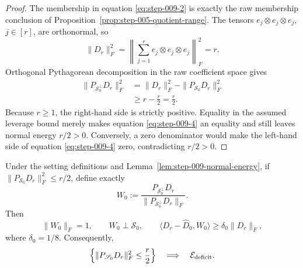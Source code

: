 \begin{proof}
The membership in equation \eqref{eq:step-009-2} is exactly the raw
membership conclusion of
Proposition~\ref{prop:step-005-quotient-range}. The tensors
\(e_j\otimes e_j\otimes e_j\), \(j\in[r]\), are orthonormal, so
\begin{equation}
  \|D_r\|_F^2
  =\left\|\sum_{j=1}^r e_j\otimes e_j\otimes e_j\right\|_F^2
  =r.
  \label{eq:step-009-3}
\end{equation}
Orthogonal Pythagorean decomposition in the raw coefficient space gives
\begin{equation}
\begin{aligned}
  \|P_{\mathscr S_0^\perp}D_r\|_F^2
  &=\|D_r\|_F^2-\|P_{\mathscr S_0}D_r\|_F^2\\
  &\ge r-\frac r2
   =\frac r2.
\end{aligned}\label{eq:step-009-4}
\end{equation}
Because \(r\ge1\), the right-hand side is strictly positive. Equality in
the assumed leverage bound merely makes equation \eqref{eq:step-009-4} an equality and still leaves normal energy
\(r/2>0\). Conversely, a zero denominator would make the left-hand side of
equation \eqref{eq:step-009-4} zero, contradicting \(r/2>0\). 

\end{proof}


\begin{proposition}
\label{prop:step-009-raw-witness}
Under the setting definitions and
Lemma~\ref{lem:step-009-normal-energy}, if
\(\|P_{\mathscr S_0}D_r\|_F^2\le r/2\), define exactly
\begin{equation}
  W_0:=\frac{P_{\mathscr S_0^\perp}D_r}
  {\|P_{\mathscr S_0^\perp}D_r\|_F}.
  \label{eq:step-009-5}
\end{equation}
Then
\begin{equation}
  \|W_0\|_F=1,
  \qquad
  W_0\perp\mathscr S_0,
  \qquad
  \langle D_r-\widehat D_0,W_0\rangle
  \ge\delta_0\|D_r\|_F,
  \label{eq:step-009-6}
\end{equation}
where \(\delta_0=1/8\). Consequently,
\begin{equation}
  \left\{\|P_{\mathscr S_0}D_r\|_F^2\le\frac r2\right\}
  \quad\Longrightarrow\quad
  \mathcal E_{\rm deficit}.
  \label{eq:step-009-7}
\end{equation}

\end{proposition}

